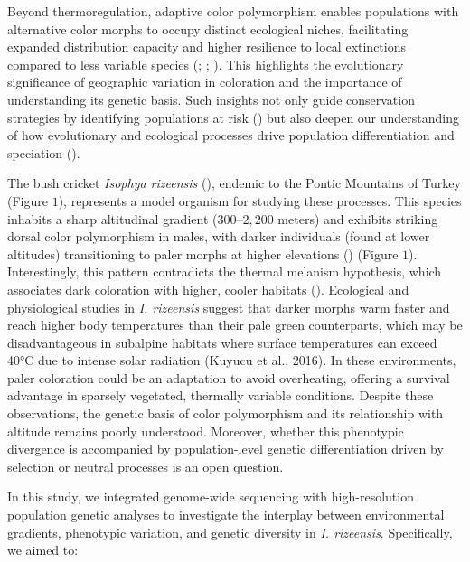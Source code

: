 \documentclass[9pt,a4paper,twoside]{rho-class/rho}
\begin{document}
    Beyond thermoregulation, adaptive color polymorphism enables populations with alternative color morphs to occupy distinct ecological niches, facilitating expanded distribution capacity and higher resilience to local extinctions compared to less variable species (\cite{Forsman2008}; \cite{Wennersten2009}; \cite{Kozlov2022}). This highlights the evolutionary significance of geographic variation in coloration and the importance of understanding its genetic basis. Such insights not only guide conservation strategies by identifying populations at risk (\cite{Forsman2016}) but also deepen our understanding of how evolutionary and ecological processes drive population differentiation and speciation (\cite{McLean2014}).
    
    The bush cricket \textit{Isophya rizeensis} (\cite{SEVGILI2003}), endemic to the Pontic Mountains of Turkey (Figure $1$), represents a model organism for studying these processes. This species inhabits a sharp altitudinal gradient ($300$–$2,200$ meters) and exhibits striking dorsal color polymorphism in males, with darker individuals (found at lower altitudes) transitioning to paler morphs at higher elevations (\cite{Çağlar2014}) (Figure $1$). Interestingly, this pattern contradicts the thermal melanism hypothesis, which associates dark coloration with higher, cooler habitats (\cite{CLUSELLATRULLAS2007}). Ecological and physiological studies in \textit{I. rizeensis} suggest that darker morphs warm faster and reach higher body temperatures than their pale green counterparts, which may be disadvantageous in subalpine habitats where surface temperatures can exceed 40°C due to intense solar radiation (Kuyucu et al., 2016). In these environments, paler coloration could be an adaptation to avoid overheating, offering a survival advantage in sparsely vegetated, thermally variable conditions. Despite these observations, the genetic basis of color polymorphism and its relationship with altitude remains poorly understood. Moreover, whether this phenotypic divergence is accompanied by population-level genetic differentiation driven by selection or neutral processes is an open question.
    
    In this study, we integrated genome-wide sequencing with high-resolution population genetic analyses to investigate the interplay between environmental gradients, phenotypic variation, and genetic diversity in \textit{I. rizeensis}. Specifically, we aimed to: 
    
\end{document}
